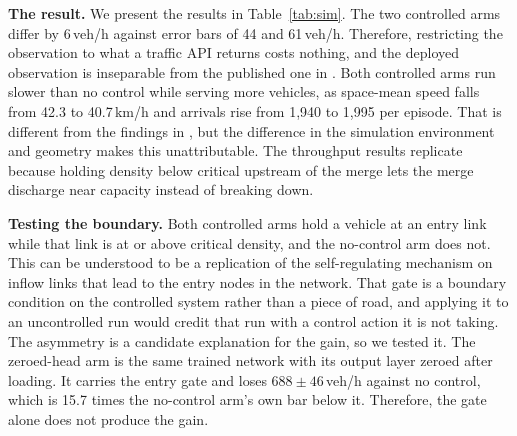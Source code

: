 \begin{table}[t]
\centering
\caption{Held-out seeds 16 to 30 on the Mainz port, paired on seed. The zeroed-head arm is the same network with its output layer zeroed, and it carries the entry gate that both controlled arms carry.}
\label{tab:sim}
\small
{}
\end{table}


\noindent\textbf{The result.} We present the results in Table~\ref{tab:sim}. The two controlled arms differ by 6\,veh/h against error bars of 44 and 61\,veh/h. Therefore, restricting the observation to what a traffic API returns costs nothing, and the deployed observation is inseparable from the published one in \cite{self_regulating_cars}. Both controlled arms run slower than no control while serving more vehicles, as space-mean speed falls from 42.3 to 40.7\,km/h and arrivals rise from 1{,}940 to 1{,}995 per episode. That is different from the findings in \cite{self_regulating_cars}, but the difference in the simulation environment and geometry makes this unattributable. The throughput results replicate because holding density below critical upstream of the merge lets the merge discharge near capacity instead of breaking down.


\noindent\textbf{Testing the boundary.} Both controlled arms hold a vehicle at an entry link while that link is at or above critical density, and the no-control arm does not. This can be understood to be a replication of the self-regulating mechanism on inflow links that lead to the entry nodes in the network. That gate is a boundary condition on the controlled system rather than a piece of road, and applying it to an uncontrolled run would credit that run with a control action it is not taking. The asymmetry is a candidate explanation for the gain, so we tested it. The zeroed-head arm is the same trained network with its output layer zeroed after loading. It carries the entry gate and loses $688 \pm 46$\,veh/h against no control, which is 15.7 times the no-control arm's own bar below it. Therefore, the gate alone does not produce the gain.


